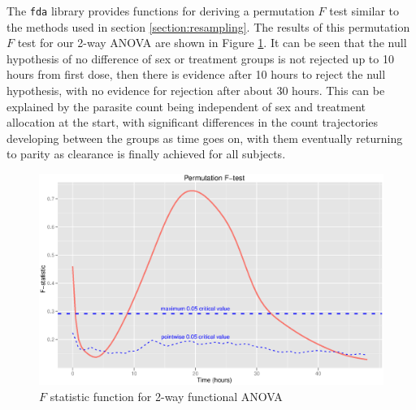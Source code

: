 The \texttt{fda} library provides functions for deriving a permutation $F$ test similar to the methods used in section \ref{section:resampling}. The results of this permutation $F$ test for our 2-way ANOVA are shown in Figure \ref{fdapermF}. It can be seen that the null hypothesis of no difference of sex or treatment groups is not rejected up to 10 hours from first dose, then there is evidence after 10 hours to reject the null hypothesis, with no evidence for rejection after about 30 hours. This can be explained by the parasite count being independent of sex and treatment allocation at the start, with significant differences in the count trajectories developing between the groups as time goes on, with them eventually returning to parity as clearance is finally achieved for all subjects.
\begin{figure}[p]
\includegraphics[width=150mm]{fdapermF.eps} 
\caption{$F$ statistic function for 2-way functional ANOVA}
\label{fdapermF}
\end{figure}


